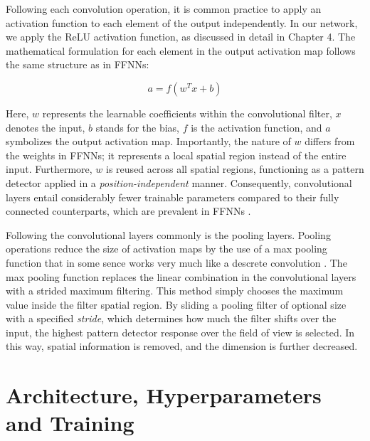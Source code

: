\documentclass[a4paper, UKenglish, 11pt]{uiomaster}
\begin{document}
Following each convolution operation, it is common practice to apply an activation function to each element of the output independently. In our network, we apply the ReLU activation function, as discussed in detail in Chapter 4. The mathematical formulation for each element in the output activation map follows the same structure as in FFNNs:

\begin{equation}
a = f(w^{T}x + b)
\end{equation}

Here, $w$ represents the learnable coefficients within the convolutional filter, $x$ denotes the input, $b$ stands for the bias, $f$ is the activation function, and $a$ symbolizes the output activation map. Importantly, the nature of $w$ differs from the weights in FFNNs; it represents a local spatial region instead of the entire input. Furthermore, $w$ is reused across all spatial regions, functioning as a pattern detector applied in a \emph{position-independent} manner. Consequently, convolutional layers entail considerably fewer trainable parameters compared to their fully connected counterparts, which are prevalent in FFNNs \cite{IN5400-Lecture3}.

Following the convolutional layers commonly is the pooling layers. Pooling operations reduce the size of activation maps by the use of a max pooling function that in some sence works very much like a descrete convolution \cite{dumoulin2018}. The max pooling function replaces the linear combination in the convolutional layers with a strided maximum filtering. This method simply chooses the maximum value inside the filter spatial region. By sliding a pooling filter of optional size with a specified \emph{stride}, which determines how much the filter shifts over the input, the highest pattern detector response over the field of view is selected. In this way, spatial information is removed, and the dimension is further decreased.


\section{Architecture, Hyperparameters and Training}
\end{document}
